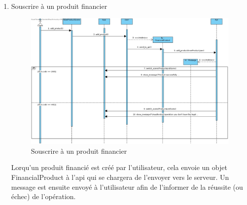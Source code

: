 \documentclass[../rapport.tex]{subfiles}
\begin{document}
\begin{enumerate}
\newpage	
		\item{Souscrire à un produit financier}\\
			\begin{figure}[h]
				\centering\includegraphics[scale=0.3]{ressources/photos_diagrammes/app1/sequences/souscrireProduit.jpg}
				\caption{Souscrire à un produit financier}
			\end{figure}	
Lorqu'un produit financié est créé par l'utilisateur, cela envoie un objet FinancialProduct à l'api qui se chargera de l'envoyer vers le serveur.
Un message est ensuite envoyé à l'utilisateur afin de l'informer de la réussite (ou échec) de l'opération.
\newpage
\end{enumerate}
\end{document}
